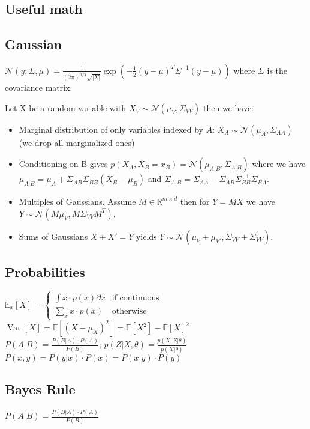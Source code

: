 \documentclass[11pt]{article}
\newcommand{\gauss}{\mathcal{N}}
\begin{document}
	
	\begin{multicols*}{3}
	
	\section*{Useful math}
	\subsection*{Gaussian}
	$\gauss(y;\Sigma,\mu) = \frac{1}{(2\pi)^{n/2} \sqrt{|\Sigma|}} \exp \left( - \frac{1}{2} (y-\mu)^T \Sigma^{-1}(y-\mu) \right) $ where $\Sigma$ is the covariance matrix.
	
	Let X be a random variable with $X_V \sim \gauss(\mu_V,\Sigma_{VV})$ then we have:
	\begin{itemize}
		\item Marginal distribution of only variables indexed by $A$: $X_A \sim \gauss(\mu_A,\Sigma_{AA})$ (we drop all marginalized ones)
		\item Conditioning on B gives $p(X_A,X_B = x_B) = \gauss(\mu_{A|B},\Sigma_{A|B})$ where we have $\mu_{A|B} = \mu_A + \Sigma_{AB}\Sigma_{BB}^{-1}(X_B - \mu_B)$ and $\Sigma_{A|B} = \Sigma_{AA} - \Sigma_{AB}\Sigma_{BB}^{-1}\Sigma_{BA}$.
		\item Multiples of Gaussians. Assume $M\in \mathbb{R}^{m\times d}$ then for $Y=MX$ we have $Y\sim \gauss (M\mu_V,M\Sigma_{VV}M^T)$.
		\item Sums of Gaussians $X+X'=Y$ yields $Y\sim \gauss (\mu_V + \mu_{V'} ,\Sigma_{VV} + \Sigma^{'}_{VV})$.
	\end{itemize}
	
	

	
	\subsection*{Probabilities}
	$\mathbb{E}_x[X] = \begin{cases}
		\int x \cdot p(x) \partial x  & \text{if continuous}\\
		\sum_x x \cdot p(x) & \text{otherwise}
	\end{cases}$\\
	$\operatorname{Var}[X] = \mathbb{E}[(X-\mu_X)^2] = \mathbb{E}[X^2] - \mathbb{E}[X]^2$\\
	$P(A|B) = \frac{P(B|A) \cdot P(A)}{P(B)}$; $p(Z|X,\theta) = \frac{p(X,Z|\theta)}{p(X|\theta)}$\\
	$P(x,y) = P(y|x) \cdot  P(x) = P(x|y) \cdot P(y)$
	
	\subsection*{{Bayes Rule}}
	$P(A|B) = \frac{P(B|A) \cdot P(A)}{P(B)}$
	

\end{multicols*}
\end{document}
